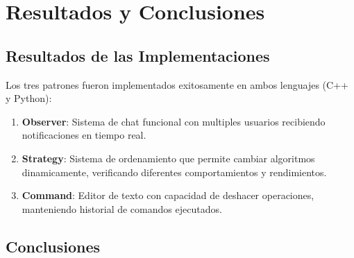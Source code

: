 \documentclass[11pt,a4paper]{article}
\begin{document}
\section{Resultados y Conclusiones}

\subsection{Resultados de las Implementaciones}

Los tres patrones fueron implementados exitosamente en ambos lenguajes (C++ y Python):

\begin{enumerate}
    \item \textbf{Observer}: Sistema de chat funcional con multiples usuarios recibiendo notificaciones en tiempo real.
    
    \item \textbf{Strategy}: Sistema de ordenamiento que permite cambiar algoritmos dinamicamente, verificando diferentes comportamientos y rendimientos.
    
    \item \textbf{Command}: Editor de texto con capacidad de deshacer operaciones, manteniendo historial de comandos ejecutados.
\end{enumerate}

\subsection{Conclusiones}
\end{document}
